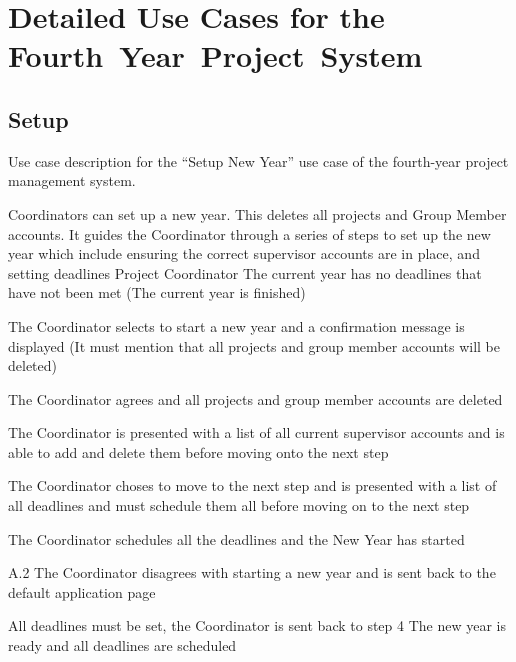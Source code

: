 \documentclass[document.tex]{subfiles}
\begin{document}
\chapter {Detailed Use Cases for the Fourth~Year~Project~System}
\label {ch:detailed-use-cases-1}

\section {Setup}
\label {sec:detailed-use-cases-1-setup}

\begin{table}[!htbp]
  \centering
  \caption{Use case description for the ``Setup New Year'' use case of the fourth-year project management system.}
  \label{tbl:use-case-start-new-year}

  \begin{usecase}
    Coordinators can set up a new year. This deletes all projects and Group Member accounts. It guides the Coordinator through a series of steps to set up the new year which include ensuring the correct supervisor accounts are in place, and setting deadlines
    Project Coordinator
    The current year has no deadlines that have not been met (The current year is finished)
    \ucnormal
    \begin{ucenum}
      \item The Coordinator selects to start a new year and a confirmation message is displayed (It must mention that all projects and group member accounts will be deleted)
      \item The Coordinator agrees and all projects and group member accounts are deleted
      \item The Coordinator is presented with a list of all current supervisor accounts and is able to add and delete them before moving onto the next step
      \item The Coordinator choses to move to the next step and is presented with a list of all deadlines and must schedule them all before moving on to the next step
      \item The Coordinator schedules all the deadlines and the New Year has started
    \end{ucenum}
    \begin{ucenum*}
      \item [A.2] The Coordinator disagrees with starting a new year and is sent back to the default application page
    \end{ucenum*}
    All deadlines must be set, the Coordinator is sent back to step 4
    The new year is ready and all deadlines are scheduled
  \end{usecase}
\end{table}
\end{document}

